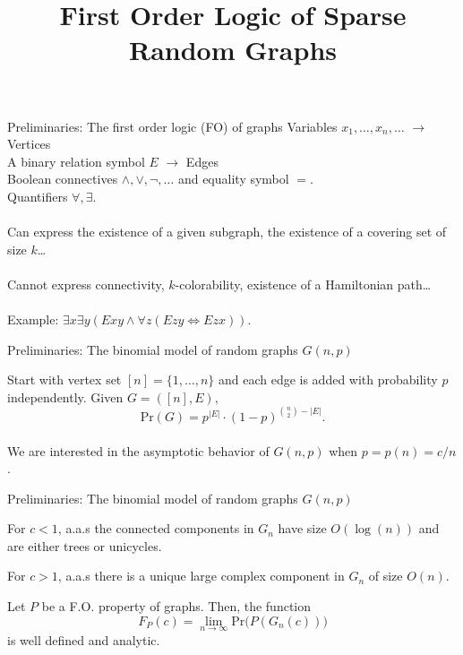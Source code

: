 \documentclass[handout, 11pt]{beamer}
\title[First Order Logic of Sparse Random Graphs]{First Order
Logic of Sparse Random Graphs}
\newcommand{\Ln}{\lim\limits_{n\to \infty}}
\begin{document}
	\frame{\titlepage}

\begin{frame}{Preliminaries: The first order logic (FO) of graphs}
	Variables $x_1, \dots, x_n, \dots$ $\rightarrow$ Vertices\\
	A binary relation symbol $E$ $\rightarrow$ Edges\\
	Boolean connectives $\wedge, \vee, \neg, \dots$ and equality symbol $=$.\\
	Quantifiers $\forall, \exists$.\\~\\
	
	Can express
	the existence of a given subgraph,
	the existence of a covering set of size $k$\dots
	\\~\\	
	Cannot express connectivity, $k$-colorability, existence of a Hamiltonian
	path\dots
	\\~\\
	Example: 
	$\exists x \exists y (Exy \wedge \forall z(Ezy \iff Ezx))$.
\end{frame}

\begin{frame}{Preliminaries: The binomial model of random graphs $G(n,p)$}

	Start with vertex set $[n]=\{1,\dots, n\}$ and
	each edge is added with probability $p$ independently. 
	Given $G=([n],E)$,
	\[ \mathrm{Pr}(G)= p^{|E|}\cdot (1-p)^{\binom{n}{2}- |E|}. \]
~\\
We are interested in the asymptotic behavior of 
$G(n,p)$ when $p=p(n)=c/n$.
\end{frame}

\begin{frame}{Preliminaries: The binomial model of random graphs $G(n,p)$}


\begin{theorem}
	For $c<1$, a.a.s the connected components in
	$G_n$ have size $O(\log(n))$ and are either
	trees or unicycles.\par
	For $c > 1$, a.a.s there is a unique large 
	complex component in $G_n$ of size $O(n)$.	 
\end{theorem}

\begin{theorem}[Lynch, 1960] 
	Let $P$ be a F.O. property of graphs. Then,
	the function
	\[
	F_{P}(c)= \Ln \mathrm{Pr}\big( P(G_n(c)) \big)
	\]
	is well defined and analytic.
\end{theorem}
\end{frame}
\end{document}
